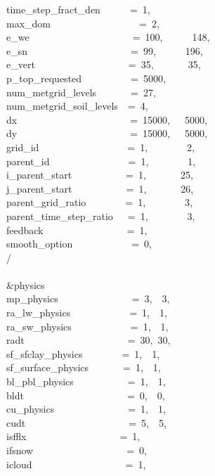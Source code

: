 time\_step\_fract\_den~~~~~~=~1,\\
max\_dom~~~~~~~~~~~~~~~~~~=~2,\\
e\_we~~~~~~~~~~~~~~~~~~~~~=~100,~~~~~~148,~~~~\\
e\_sn~~~~~~~~~~~~~~~~~~~~~=~99,~~~~~~196,~~~~\\
e\_vert~~~~~~~~~~~~~~~~~~~=~35,~~~~~~~35,~~~~\\
p\_top\_requested~~~~~~~~~~=~5000,\\
num\_metgrid\_levels~~~~~~~=~27,\\
num\_metgrid\_soil\_levels~~=~4,\\
dx~~~~~~~~~~~~~~~~~~~~~~~=~15000,~~~5000,\\
dy~~~~~~~~~~~~~~~~~~~~~~~=~15000,~~~5000,\\
grid\_id~~~~~~~~~~~~~~~~~~=~1,~~~~~~~~2,~~~~~~\\
parent\_id~~~~~~~~~~~~~~~~=~1,~~~~~~~~1,~~~~~~\\
i\_parent\_start~~~~~~~~~~~=~1,~~~~~~~25,~~~~~~\\
j\_parent\_start~~~~~~~~~~~=~1,~~~~~~~26,~~~~~~\\
parent\_grid\_ratio~~~~~~~~=~1,~~~~~~~~3,~~~~~~\\
parent\_time\_step\_ratio~~~=~1,~~~~~~~~3,~~~~~~\\
feedback~~~~~~~~~~~~~~~~~=~1,\\
smooth\_option~~~~~~~~~~~~=~0,\\
/\\
\\
\&physics~~~~~~~~~~~~~~~~~\\
mp\_physics~~~~~~~~~~~~~~~=~3,~~3,~\\
ra\_lw\_physics~~~~~~~~~~~~=~1,~~1,~\\
ra\_sw\_physics~~~~~~~~~~~~=~1,~~1,~\\
radt~~~~~~~~~~~~~~~~~~~~~=~30,~30,\\
sf\_sfclay\_physics~~~~~~~~=~1,~~1,~\\
sf\_surface\_physics~~~~~~~=~1,~~1,~\\
bl\_pbl\_physics~~~~~~~~~~~=~1,~~1,~\\
bldt~~~~~~~~~~~~~~~~~~~~~=~0,~~0,~\\
cu\_physics~~~~~~~~~~~~~~~=~1,~~1,~\\
cudt~~~~~~~~~~~~~~~~~~~~~=~5,~~5,~\\
isfflx~~~~~~~~~~~~~~~~~~~=~1,\\
ifsnow~~~~~~~~~~~~~~~~~~~=~0,\\
icloud~~~~~~~~~~~~~~~~~~~=~1,\\
